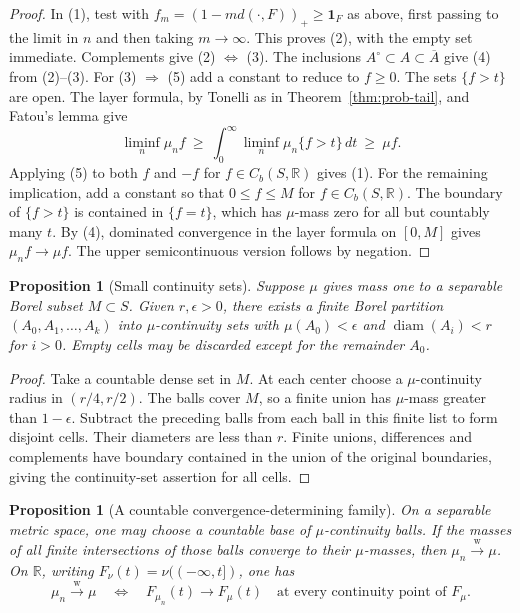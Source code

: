 \documentclass[11pt,oneside,openany]{book}
\newcommand{\R}{\mathbb{R}}
\newcommand{\ind}{\mathbf{1}}
\newcommand{\weakto}{\xrightarrow{\mathrm{w}}}
\theoremstyle{plain}
\newtheorem{proposition}[theorem]{Proposition}
\theoremstyle{definition}
\theoremstyle{remark}
\begin{document}
\begin{proof}
In (1), test with \(f_m=(1-m d(\cdot,F))_+\geq\ind_F\) as above, first
passing to the limit in \(n\) and then taking \(m\to\infty\). This proves
(2), with the empty set immediate. Complements give (2) \(\Leftrightarrow\)
(3). The inclusions \(A^\circ\subset A\subset\overline A\) give (4) from
(2)--(3). For (3) \(\Rightarrow\) (5) add a constant to reduce to \(f\geq0\).
The sets \(\{f>t\}\) are open. The layer formula, by Tonelli as in
Theorem~\ref{thm:prob-tail}, and Fatou's lemma give
\[
 \liminf_n\mu_n f
 \ \geq\ \int_0^\infty\liminf_n\mu_n\{f>t\}\,dt
 \ \geq\ \mu f.
\]
Applying (5) to both \(f\) and \(-f\) for \(f\in C_b(S,\R)\) gives (1).
For the remaining implication, add a constant so that \(0\leq f\leq M\)
for \(f\in C_b(S,\R)\). The boundary of \(\{f>t\}\) is contained in
\(\{f=t\}\), which has \(\mu\)-mass zero for all but countably many \(t\).
By (4), dominated convergence in the layer formula on \([0,M]\) gives
\(\mu_n f\to\mu f\). The upper semicontinuous version follows by negation.
\end{proof}

\begin{proposition}[Small continuity sets]
\label{prop:p06-small-cells}
Suppose \(\mu\) gives mass one to a separable Borel subset \(M\subset S\).
Given \(r,\epsilon>0\), there exists a finite Borel partition
\((A_0,A_1,\ldots,A_k)\) into \(\mu\)-continuity sets with
\(\mu(A_0)<\epsilon\) and \(\operatorname{diam}(A_i)<r\) for \(i>0\).
Empty cells may be discarded except for the remainder \(A_0\).
\end{proposition}

\begin{proof}
Take a countable dense set in \(M\). At each center choose a
\(\mu\)-continuity radius in \((r/4,r/2)\). The balls cover \(M\), so a
finite union has \(\mu\)-mass greater than \(1-\epsilon\). Subtract the
preceding balls from each ball in this finite list to form disjoint
cells. Their diameters are less than \(r\). Finite unions, differences
and complements have boundary contained in the union of the original
boundaries, giving the continuity-set assertion for all cells.
\end{proof}

\begin{proposition}[A countable convergence-determining family]
\label{prop:p06-determining-class}
On a separable metric space, one may choose a countable base of
\(\mu\)-continuity balls. If the masses of all finite intersections of
those balls converge to their \(\mu\)-masses, then
\(\mu_n\weakto\mu\).
On \(\R\), writing \(F_\nu(t)=\nu((-\infty,t])\), one has
\[
 \mu_n\weakto\mu
 \quad\Longleftrightarrow\quad
 F_{\mu_n}(t)\longrightarrow F_\mu(t)
 \quad\text{at every continuity point of }F_\mu .
\]
\end{proposition}
\end{document}
